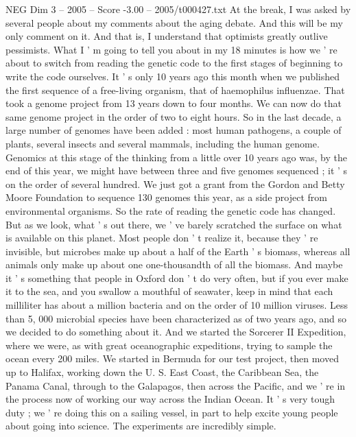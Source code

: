 \begin{textsample}{NEG Dim 3 – 2005 – Score -3.00 – 2005/t000427.txt}  \label{ex:f3_neg_034}
At the break, I was asked by several people about my comments about the aging debate.
And this will be my only comment on it.
And that is, I understand that optimists greatly outlive pessimists.
What I ' m going to tell you about in my 18 minutes is how we ' re about to switch from reading the genetic code to the first stages of beginning to write the code ourselves.
It ' s only 10 years ago this month when we published the first sequence of a free-living organism, that of haemophilus influenzae.
That took a genome project from 13 years down to four months.
We can now do that same genome project in the order of two to eight hours.
So in the last decade, a large number of genomes have been added : most human pathogens, a couple of plants, several insects and several mammals, including the human genome.
Genomics at this stage of the thinking from a little over 10 years ago was, by the end of this year, we might have between three and five genomes sequenced ; it ' s on the order of several hundred.
We just got a grant from the Gordon and Betty Moore Foundation to sequence 130 genomes this year, as a side project from environmental organisms.
So the rate of reading the genetic code has changed.
But as we look, what ' s out there, we ' ve barely scratched the surface on what is available on this planet.
Most people don ' t realize it, because they ' re invisible, but microbes make up about a half of the Earth ' s biomass, whereas all animals only make up about one one-thousandth of all the biomass.
And maybe it ' s something that people in Oxford don ' t do very often, but if you ever make it to the sea, and you swallow a mouthful of seawater, keep in mind that each milliliter has about a million bacteria and on the order of 10 million viruses.
Less than 5, 000 microbial species have been characterized as of two years ago, and so we decided to do something about it.
And we started the Sorcerer II Expedition, where we were, as with great oceanographic expeditions, trying to sample the ocean every 200 miles.
We started in Bermuda for our test project, then moved up to Halifax, working down the U.
S.
East Coast, the Caribbean Sea, the Panama Canal, through to the Galapagos, then across the Pacific, and we ' re in the process now of working our way across the Indian Ocean.
It ' s very tough duty ; we ' re doing this on a sailing vessel, in part to help excite young people about going into science.
The experiments are incredibly simple.

\end{textsample}
